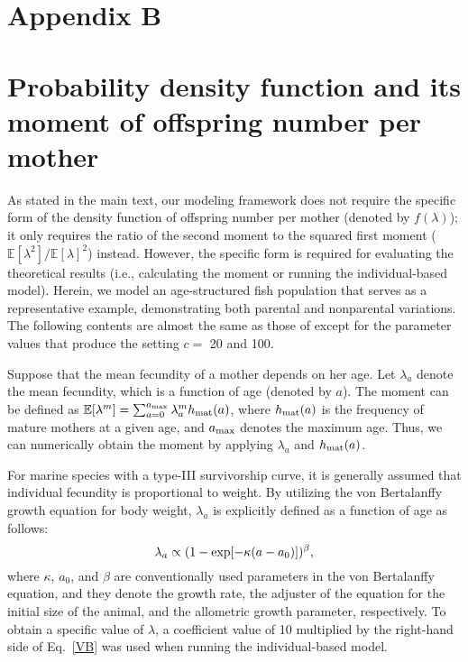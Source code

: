 \documentclass[12pt, English]{article}
\begin{document}
\begin{spacing}{1.9}
\section*{Appendix B}
\setcounter{equation}{0}
\section*{Probability density function and its moment of offspring number per mother}
\renewcommand{\theequation}{B\arabic{equation}}

As stated in the main text, our modeling framework does not require the specific form of the density function of offspring number per mother (denoted by $f(\lambda)$); it only requires the ratio of the second moment to the squared first moment ($\mathbb{E}[\lambda^2] / \mathbb{E}[\lambda]^2$) instead. However, the specific form is required for evaluating the theoretical results (i.e., calculating the moment or running the individual-based model). Herein, we model an age-structured fish population that serves as a representative example, demonstrating both parental and nonparental variations. The following contents are almost the same as those of \cite{Akita_2019} except for the parameter values that produce the setting $c=$ 20 and 100.

Suppose that the mean fecundity of a mother depends on her age. Let $\lambda_a$ denote the mean fecundity, which is a function of age (denoted by $a$). The moment can be defined as $\mathbb{E}[\lambda^m] = \sum_{a=0}^{a_{\rm max}} \lambda_a^m h_{\rm mat}(a)$, where $h_{\rm mat}(a)$ is the frequency of mature mothers at a given age, and $a_{\rm max}$ denotes the maximum age. Thus, we can numerically obtain the moment by applying $\lambda_a$ and $h_{\rm mat}(a)$. 

For marine species with a type-III survivorship curve, it is generally assumed that individual fecundity is proportional to weight. By utilizing the von Bertalanffy growth equation for body weight, $\lambda_a$ is explicitly defined as a function of age as follows:  
\begin{equation}
\lambda_a \propto ( 1-{\rm exp}[-\kappa(a-a_0)])^{\beta}, 
\label{VB}
\end{equation}
where $\kappa$, $a_0$, and $\beta$ are conventionally used parameters in the von Bertalanffy equation, and they denote the growth rate, the adjuster of the equation for the initial size of the animal, and the allometric growth parameter, respectively. To obtain a specific value of $\lambda$, a coefficient value of 10 multiplied by the right-hand side of Eq.~\ref{VB} was used when running the individual-based model. 


\end{spacing}
\end{document}
